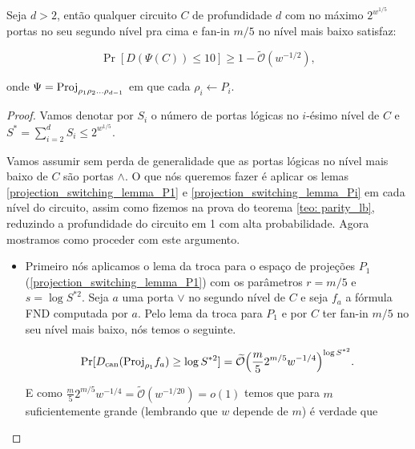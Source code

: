 \begin{prop} \label{circuit_simplifies}

Seja $d > 2$, então qualquer circuito $C$ de profundidade $d$ com no máximo $2^{w^{1/5}}$ portas no seu segundo nível pra cima e fan-in $m/5$ no nível mais baixo satisfaz:

\begin{equation*}
	\Pr[D(\Psi(C)) \leq 10] \geq 1 - \widetilde{\mathcal{O}}(w^{-1/2}),
\end{equation*}

onde $\Psi = \text{Proj}_{\rho_{1}\rho_{2}\dots\rho_{d - 1}}$ em que cada $\rho_{i} \leftarrow P_{i}$.

\end{prop}

\begin{proof}

Vamos denotar por $S_{i}$ o número de portas lógicas no $i$-ésimo nível de $C$ e $S^{*} = \sum_{i = 2}^{d} S_{i} \leq 2^{w^{1/5}}$.

Vamos assumir sem perda de generalidade que as portas lógicas no nível mais baixo de $C$ são portas $\land$. O que nós queremos fazer é aplicar os lemas \ref{projection_switching_lemma_P1} e \ref{projection_switching_lemma_Pi} em cada nível do circuito, assim como fizemos na prova do teorema \ref{teo: parity_lb}, reduzindo a profundidade do circuito em 1 com alta probabilidade. Agora mostramos como proceder com este argumento.

\begin{itemize}

    \item Primeiro nós aplicamos o lema da troca para o espaço de projeções $P_{1}$ (\ref{projection_switching_lemma_P1}) com os parâmetros $r = m/5$ e $s = \log S^{* 2}$. Seja $a$ uma porta $\lor$ no segundo nível de $C$ e seja $f_{a}$ a fórmula FND computada por $a$. Pelo lema da troca para $P_{1}$ e por $C$ ter fan-in $m/5$ no seu nível mais baixo, nós temos o seguinte.
    
    \begin{equation*}
        \Pr[D_{\text{can}}(\text{Proj}_{\rho_{1}}f_{a}) \geq \log S^{* 2}] = \widetilde{\mathcal{O}}\Big( \frac{m}{5}2^{m/5} w^{-1/4}\Big)^{\log S^{* 2}}.
    \end{equation*}
    
    E como $\frac{m}{5}2^{m/5}w^{-1/4} = \widetilde{\mathcal{O}}(w^{-1/20}) = o(1)$ temos que para $m$ suficientemente grande (lembrando que $w$ depende de $m$) é verdade que
    

\end{itemize}
\end{proof}
